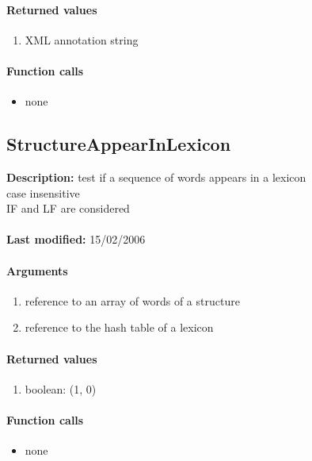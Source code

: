 \paragraph{Returned values}
\begin{enumerate}
\item XML annotation string
\end{enumerate}

\paragraph{Function calls}
\begin{itemize}
\item none
\end{itemize}

\subsection{StructureAppearInLexicon}
\textbf{Description:} test if a sequence of words appears in a lexicon\\
case insensitive\\
IF and LF are considered\\
\\\textbf{Last modified:} 15/02/2006

\paragraph{Arguments}
\begin{enumerate}
\item reference to an array of words of a structure
\item reference to the hash table of a lexicon
\end{enumerate}

\paragraph{Returned values}
\begin{enumerate}
\item boolean: (1, 0)
\end{enumerate}

\paragraph{Function calls}
\begin{itemize}
\item none
\end{itemize}

